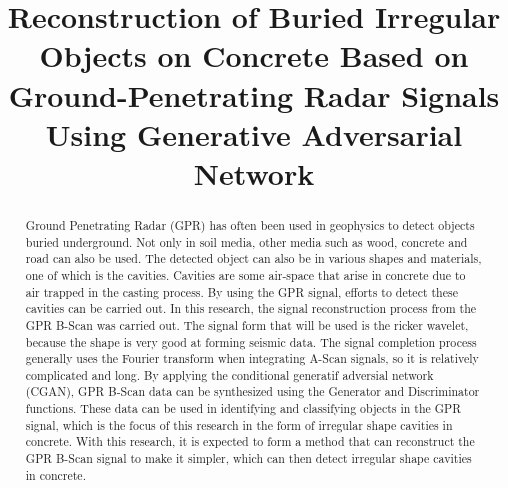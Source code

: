 \documentclass[conference]{IEEEtran}
\begin{document}
\title{Reconstruction of Buried Irregular Objects on Concrete Based on Ground-Penetrating Radar Signals Using Generative Adversarial Network\\}

\author{
\and
{}
\and
{}
}

\maketitle

\begin{abstract}
  Ground Penetrating Radar (GPR) has often been used in geophysics to detect objects buried underground. 
  Not only in soil media, other media such as wood, concrete and road can also be used. 
  The detected object can also be in various shapes and materials, one of which is the cavities. 
  Cavities are some air-space that arise in concrete due to air trapped in the casting process. 
  By using the GPR signal, efforts to detect these cavities can be carried out. 
  In this research, the signal reconstruction process from the GPR B-Scan was carried out. 
  The signal form that will be used is the ricker wavelet, because the shape is very good at forming seismic data. 
  The signal completion process generally uses the Fourier transform when integrating A-Scan signals, so it is relatively complicated and long. 
  By applying the conditional generatif adversial network (CGAN), GPR B-Scan data can be synthesized using the Generator and Discriminator functions. 
  These data can be used in identifying and classifying objects in the GPR signal, which is the focus of this research in the form of irregular shape cavities in concrete. 
  With this research, it is expected to form a method that can reconstruct the GPR B-Scan signal to make it simpler, which can then detect irregular shape cavities in concrete.
\end{abstract}
\end{document}
